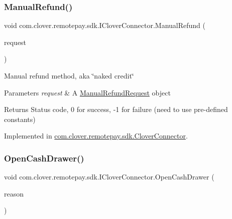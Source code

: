 \subsubsection{\texorpdfstring{Manual\+Refund()}{ManualRefund()}}
{\footnotesize\ttfamily void com.\+clover.\+remotepay.\+sdk.\+I\+Clover\+Connector.\+Manual\+Refund (\begin{DoxyParamCaption}\item[{\hyperlink{classcom_1_1clover_1_1remotepay_1_1sdk_1_1_manual_refund_request}{Manual\+Refund\+Request}}]{request }\end{DoxyParamCaption})}



Manual refund method, aka \char`\"{}naked credit\char`\"{} 


\begin{DoxyParams}{Parameters}
{\em request} & A \hyperlink{classcom_1_1clover_1_1remotepay_1_1sdk_1_1_manual_refund_request}{Manual\+Refund\+Request} object\\
\hline
\end{DoxyParams}
\begin{DoxyReturn}{Returns}
Status code, 0 for success, -\/1 for failure (need to use pre-\/defined constants)
\end{DoxyReturn}


Implemented in \hyperlink{classcom_1_1clover_1_1remotepay_1_1sdk_1_1_clover_connector_a0ecc7e8c3333a05853297c46adc8822c}{com.\+clover.\+remotepay.\+sdk.\+Clover\+Connector}.

\mbox{\label{interfacecom_1_1clover_1_1remotepay_1_1sdk_1_1_i_clover_connector_a0fc361c449dc63eab061ca6866124deb}} 
\subsubsection{\texorpdfstring{Open\+Cash\+Drawer()}{OpenCashDrawer()}\hspace{0.1cm}{\footnotesize\ttfamily [1/2]}}
{\footnotesize\ttfamily void com.\+clover.\+remotepay.\+sdk.\+I\+Clover\+Connector.\+Open\+Cash\+Drawer (\begin{DoxyParamCaption}\item[{String}]{reason }\end{DoxyParamCaption})}



